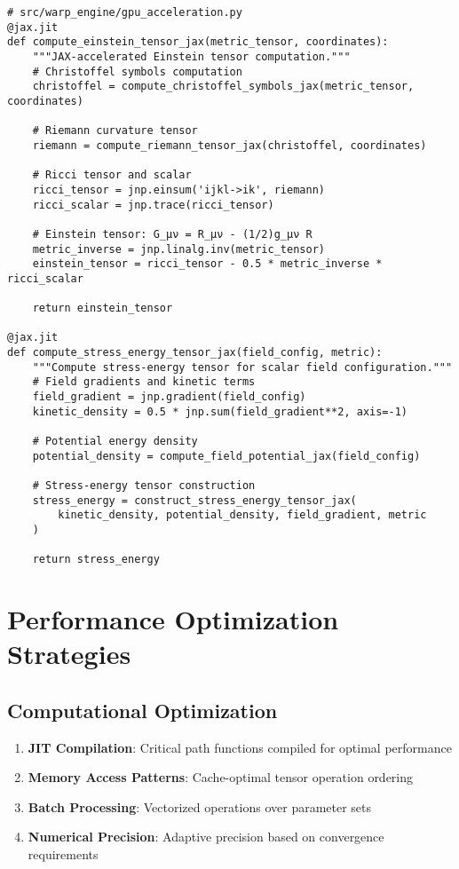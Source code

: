 \documentclass{article}
\begin{document}
\begin{lstlisting}
# src/warp_engine/gpu_acceleration.py
@jax.jit
def compute_einstein_tensor_jax(metric_tensor, coordinates):
    """JAX-accelerated Einstein tensor computation."""
    # Christoffel symbols computation
    christoffel = compute_christoffel_symbols_jax(metric_tensor, coordinates)
    
    # Riemann curvature tensor
    riemann = compute_riemann_tensor_jax(christoffel, coordinates)
    
    # Ricci tensor and scalar
    ricci_tensor = jnp.einsum('ijkl->ik', riemann)
    ricci_scalar = jnp.trace(ricci_tensor)
    
    # Einstein tensor: G_μν = R_μν - (1/2)g_μν R
    metric_inverse = jnp.linalg.inv(metric_tensor)
    einstein_tensor = ricci_tensor - 0.5 * metric_inverse * ricci_scalar
    
    return einstein_tensor

@jax.jit
def compute_stress_energy_tensor_jax(field_config, metric):
    """Compute stress-energy tensor for scalar field configuration."""
    # Field gradients and kinetic terms
    field_gradient = jnp.gradient(field_config)
    kinetic_density = 0.5 * jnp.sum(field_gradient**2, axis=-1)
    
    # Potential energy density
    potential_density = compute_field_potential_jax(field_config)
    
    # Stress-energy tensor construction
    stress_energy = construct_stress_energy_tensor_jax(
        kinetic_density, potential_density, field_gradient, metric
    )
    
    return stress_energy
\end{lstlisting}

\section{Performance Optimization Strategies}

\subsection{Computational Optimization}

\begin{enumerate}
\item \textbf{JIT Compilation}: Critical path functions compiled for optimal performance
\item \textbf{Memory Access Patterns}: Cache-optimal tensor operation ordering
\item \textbf{Batch Processing}: Vectorized operations over parameter sets
\item \textbf{Numerical Precision}: Adaptive precision based on convergence requirements
\end{enumerate}
\end{document}
